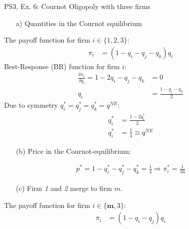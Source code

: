 \begin{frame}{PS3, Ex. 6: Cournot Oligopoly with three firms}
  \begin{multicols}{2}
    \begin{itemize}
      \item[a)] Quantities in the Cournot equilibrium
    \end{itemize}
    The payoff function for firm $i\in\{1,2,3\}$:
    \begin{align*}
        \pi_i&=(1-q_i-q_j-q_k)q_i
    \end{align*}
    Best-Response (BR) function for firm $i$:
    \begin{align*}
        \frac{\delta\pi_i}{\delta q_i}=1-2q_i-q_j-q_k&=0\\
                                                  q_i&=\frac{1-q_j-q_k}{2}
    \end{align*}
    Due to symmetry $q_i^{*}=q_j^{*}=q_k^{*}=q^{NE}$:
    \begin{align*}
        q_i^{*} &= \frac{1-2q_i^{*}}{2}\\
        q_i^{*} &= \frac{1}{4}\equiv q^{NE}
    \end{align*}
    \begin{itemize}
      \item[(b)] Price in the Cournot-equilibrium:
    \end{itemize}
    \begin{align*}
      p^{*}=1-q_i^{*}-q_j^{*}-q_k^{*}=\frac{1}{4}\Rightarrow\pi_i^{*}=\frac{1}{16}
    \end{align*}
  \vfill\null \columnbreak
    \begin{itemize}
      \item[(c)] Firm \textit{1} and \textit{2} merge to firm $m$.
    \end{itemize}
    The payoff function for firm $i\in\{\bm{m},3\}$:
    \begin{align*}
        \pi_i&=(1-q_i-q_j)q_i
    \end{align*}
  \vfill\null
  \end{multicols}
\end{frame}

